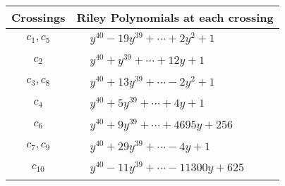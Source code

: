 \documentclass[1p]{elsarticle_modified}
\theoremstyle{definition}
\begin{document}
\begin{tabular}{m{50pt}|m{274pt}}
Crossings & \hspace{64pt}Riley Polynomials at each crossing \\
\hline $$\begin{aligned}c_{1},c_{5}\end{aligned}$$&$\begin{aligned}
&y^{40}-19 y^{39}+\cdots+2 y^2+1
\end{aligned}$\\
\hline $$\begin{aligned}c_{2}\end{aligned}$$&$\begin{aligned}
&y^{40}+y^{39}+\cdots+12 y+1
\end{aligned}$\\
\hline $$\begin{aligned}c_{3},c_{8}\end{aligned}$$&$\begin{aligned}
&y^{40}+13 y^{39}+\cdots-2 y^2+1
\end{aligned}$\\
\hline $$\begin{aligned}c_{4}\end{aligned}$$&$\begin{aligned}
&y^{40}+5 y^{39}+\cdots+4 y+1
\end{aligned}$\\
\hline $$\begin{aligned}c_{6}\end{aligned}$$&$\begin{aligned}
&y^{40}+9 y^{39}+\cdots+4695 y+256
\end{aligned}$\\
\hline $$\begin{aligned}c_{7},c_{9}\end{aligned}$$&$\begin{aligned}
&y^{40}+29 y^{39}+\cdots-4 y+1
\end{aligned}$\\
\hline $$\begin{aligned}c_{10}\end{aligned}$$&$\begin{aligned}
&y^{40}-11 y^{39}+\cdots-11300 y+625
\end{aligned}$\\
\hline
\end{tabular}
\vskip 2pc
\end{document}
